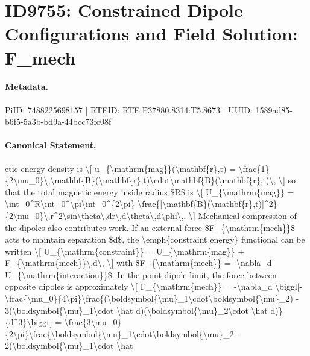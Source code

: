 \section*{ID9755: Constrained Dipole Configurations and Field Solution: F\_mech}
\paragraph{Metadata.}
PiID: 7488225698157 | RTEID: RTE:P37880.8314:T5.8673 | UUID: 1589ad85-b6f5-5a3b-bd9a-44bcc73fc08f

\paragraph{Canonical Statement.}
etic energy density is \textbackslash{}[ u\_\{\textbackslash{}mathrm\{mag\}\}(\textbackslash{}mathbf\{r\},t) = \textbackslash{}frac\{1\}\{2\textbackslash{}mu\_0\}\textbackslash{},\textbackslash{}mathbf\{B\}(\textbackslash{}mathbf\{r\},t)\textbackslash{}cdot\textbackslash{}mathbf\{B\}(\textbackslash{}mathbf\{r\},t)\textbackslash{}, \textbackslash{}] so that the total magnetic energy inside radius \$R\$ is \textbackslash{}[ U\_\{\textbackslash{}mathrm\{mag\}\} = \textbackslash{}int\_0\textasciicircum{}R\textbackslash{}int\_0\textasciicircum{}\textbackslash{}pi\textbackslash{}int\_0\textasciicircum{}\{2\textbackslash{}pi\} \textbackslash{}frac\{|\textbackslash{}mathbf\{B\}(\textbackslash{}mathbf\{r\},t)|\textasciicircum{}2\}\{2\textbackslash{}mu\_0\}\textbackslash{},r\textasciicircum{}2\textbackslash{}sin\textbackslash{}theta\textbackslash{},dr\textbackslash{},d\textbackslash{}theta\textbackslash{},d\textbackslash{}phi\textbackslash{},. \textbackslash{}] Mechanical compression of the dipoles also contributes work. If an external force \$F\_\{\textbackslash{}mathrm\{mech\}\}\$ acts to maintain separation \$d\$, the \textbackslash{}emph\{constraint energy\} functional can be written \textbackslash{}[ U\_\{\textbackslash{}mathrm\{constraint\}\} = U\_\{\textbackslash{}mathrm\{mag\}\} + F\_\{\textbackslash{}mathrm\{mech\}\}\textbackslash{},d\textbackslash{}, \textbackslash{}] with \$F\_\{\textbackslash{}mathrm\{mech\}\} = -\textbackslash{}nabla\_d U\_\{\textbackslash{}mathrm\{interaction\}\}\$. In the point-dipole limit, the force between opposite dipoles is approximately \textbackslash{}[ F\_\{\textbackslash{}mathrm\{mech\}\} = -\textbackslash{}nabla\_d \textbackslash{}biggl[-\textbackslash{}frac\{\textbackslash{}mu\_0\}\{4\textbackslash{}pi\}\textbackslash{}frac\{(\textbackslash{}boldsymbol\{\textbackslash{}mu\}\_1\textbackslash{}cdot\textbackslash{}boldsymbol\{\textbackslash{}mu\}\_2) - 3(\textbackslash{}boldsymbol\{\textbackslash{}mu\}\_1\textbackslash{}cdot \textbackslash{}hat d)(\textbackslash{}boldsymbol\{\textbackslash{}mu\}\_2\textbackslash{}cdot \textbackslash{}hat d)\}\{d\textasciicircum{}3\}\textbackslash{}biggr] = \textbackslash{}frac\{3\textbackslash{}mu\_0\}\{2\textbackslash{}pi\}\textbackslash{}frac\{\textbackslash{}boldsymbol\{\textbackslash{}mu\}\_1\textbackslash{}cdot\textbackslash{}boldsymbol\{\textbackslash{}mu\}\_2 - 2(\textbackslash{}boldsymbol\{\textbackslash{}mu\}\_1\textbackslash{}cdot \textbackslash{}hat 